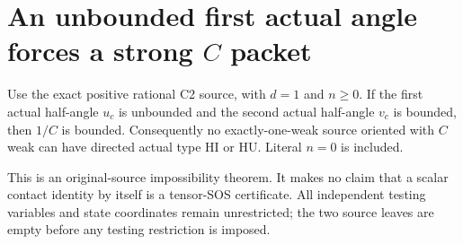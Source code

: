 \section[An unbounded first actual angle forces a strong C packet]{An unbounded first actual angle forces a strong $C$ packet}
\label{sec:c2-weak-hi-hu-empty}

\begin{theorem}
Use the exact positive rational C2 source, with $d=1$ and $n\geq0$.
If the first actual half-angle $u_c$ is unbounded and the second
actual half-angle $v_c$ is bounded, then $1/C$ is bounded.
Consequently no exactly-one-weak source oriented with $C$ weak can
have directed actual type HI or HU.  Literal $n=0$ is included.
\end{theorem}

This is an original-source impossibility theorem.  It makes no
claim that a scalar contact identity by itself is a tensor-SOS
certificate.  All independent testing variables and state coordinates
remain unrestricted; the two source leaves are empty before any
testing restriction is imposed.

